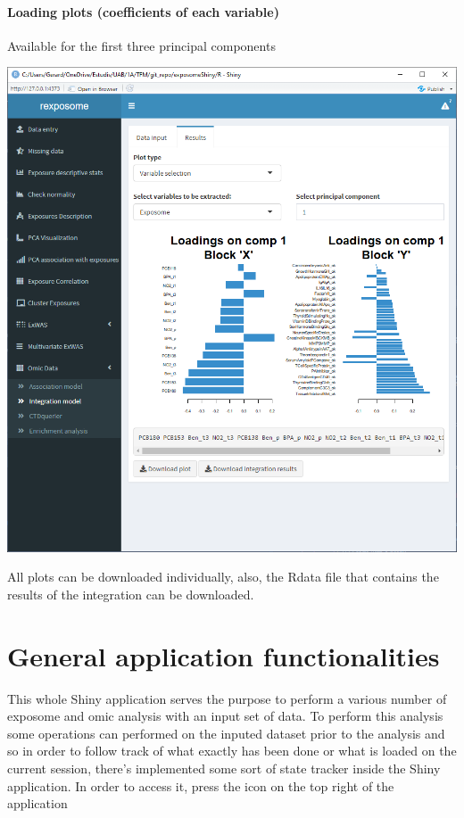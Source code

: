 \documentclass[
]{book}
\begin{document}
\hypertarget{loading-plots-coefficients-of-each-variable}{%
\subsubsection{Loading plots (coefficients of each variable)}\label{loading-plots-coefficients-of-each-variable}}

Available for the first three principal components

\includegraphics{images/analysis12_8.png}

All plots can be downloaded individually, also, the Rdata file that contains the results of the integration can be downloaded.

\hypertarget{general-application-functionalities}{%
\chapter{General application functionalities}\label{general-application-functionalities}}

This whole Shiny application serves the purpose to perform a various number of exposome and omic analysis with an input set of data. To perform this analysis some operations can performed on the inputed dataset prior to the analysis and so in order to follow track of what exactly has been done or what is loaded on the current session, there's implemented some sort of state tracker inside the Shiny application. In order to access it, press the icon on the top right of the application
\end{document}
